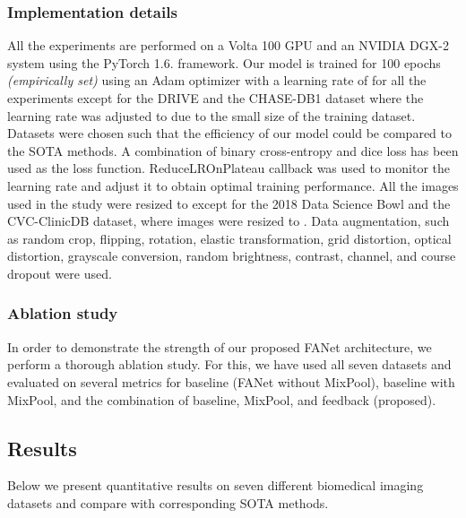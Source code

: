 \documentclass[journal]{IEEEtran}
\begin{document}
\subsubsection{Implementation details}
All the experiments are performed on a Volta 100 GPU and an NVIDIA DGX-2 system using the PyTorch 1.6. framework. Our model is trained for 100 epochs \textit{(empirically set)} using an Adam optimizer with a learning rate of  for all the experiments except for the \ac{DRIVE} and the CHASE-DB1 dataset where the learning rate was adjusted to  due to the small size of the training dataset. Datasets were chosen such that the efficiency of our model could be compared to the \ac{SOTA} methods. A combination of binary cross-entropy and dice loss has been used as the loss function. ReduceLROnPlateau callback was used to monitor the learning rate and adjust it to obtain optimal training performance. All the images used in the study were resized to  except for the 2018 Data Science Bowl and the CVC-ClinicDB dataset, where images were resized to . Data augmentation, such as random crop, flipping, rotation, elastic transformation, grid distortion, optical distortion, grayscale conversion, random brightness, contrast, channel, and course dropout were used. 



\subsubsection{Ablation study}
In order to demonstrate the strength of our proposed FANet architecture, we perform a thorough ablation study. For this, we have used all seven datasets and evaluated on several metrics for baseline (FANet without MixPool), baseline with MixPool, and the combination of baseline, MixPool, and feedback (proposed).
\subsection{Results}
\label{result}
Below we present quantitative results on seven different biomedical imaging datasets and compare with corresponding SOTA methods. 
\end{document}
